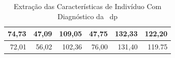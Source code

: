 \begin{table}[h]
\begin{tabular}{|r|r|r|r|r|r|}
74,73                                                                                    & 47,09                                                                                    & 109,05                                                             & 47,75                                                             & 132,33            & 122,20           \\ \hline
72,01                                                                                    & 56,02                                                                                    & 102,36                                                             & 76,00                                                             & 131,40            & 119.75      \\ \hline
\end{tabular}
\caption{Extração das Características de Indivíduo Com Diagnóstico da ~\ac{dp}}
\label{table:extracao-caracteristica}
\end{table}

